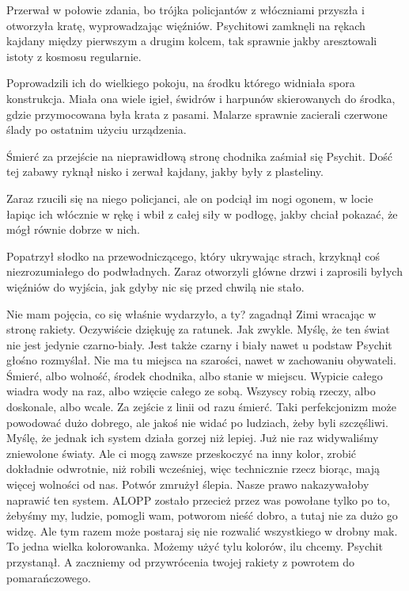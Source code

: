 Przerwał w połowie zdania, bo trójka policjantów z włóczniami przyszła i otworzyła kratę, wyprowadzając więźniów.
Psychitowi zamknęli na rękach kajdany między pierwszym a drugim kolcem, tak sprawnie jakby aresztowali istoty z kosmosu regularnie.

Poprowadzili ich do wielkiego pokoju, na środku którego widniała spora konstrukcja.
Miała ona wiele igieł, świdrów i harpunów skierowanych do środka, gdzie przymocowana była krata z pasami.
Malarze sprawnie zacierali czerwone ślady po ostatnim użyciu urządzenia.

\begin{dialogue}
\ds{} Śmierć za przejście na nieprawidłową stronę chodnika \dm{} zaśmiał się Psychit. \dm{} Dość tej zabawy \dm{} ryknął nisko i zerwał kajdany, jakby były z plasteliny.
\end{dialogue}

Zaraz rzucili się na niego policjanci, ale on podciął im nogi ogonem, w locie łapiąc ich włócznie w rękę i wbił z całej siły w podłogę, 
jakby chciał pokazać, że mógł równie dobrze w nich.

Popatrzył słodko na przewodniczącego, który ukrywając strach, krzyknął coś niezrozumiałego do podwładnych.
Zaraz otworzyli główne drzwi i zaprosili byłych więźniów do wyjścia, jak gdyby nic się przed chwilą nie stało.

\divider{}

\begin{dialogue}
\ds{} Nie mam pojęcia, co się właśnie wydarzyło, a ty? \dm{} zagadnął Zimi wracając w stronę rakiety. \dm{} Oczywiście dziękuję za ratunek. Jak zwykle.
\ds{} Myślę, że ten świat nie jest jedynie czarno-biały. Jest także czarny i biały nawet u podstaw \dm{} Psychit głośno rozmyślał. \dm{} 
Nie ma tu miejsca na szarości, nawet w zachowaniu obywateli. Śmierć, albo wolność, środek chodnika, albo stanie w miejscu. 
Wypicie całego wiadra wody na raz, albo wzięcie całego ze sobą. Wszyscy robią rzeczy, albo doskonale, albo wcale. Za zejście z linii od razu śmierć.
\ds{} Taki perfekcjonizm może powodować dużo dobrego, ale jakoś nie widać po ludziach, żeby byli szczęśliwi. Myślę, że jednak ich system działa gorzej niż lepiej.
\ds{} Już nie raz widywaliśmy zniewolone światy. Ale ci mogą zawsze przeskoczyć na inny kolor, zrobić dokładnie odwrotnie, niż robili wcześniej, więc technicznie rzecz biorąc, mają więcej wolności od nas.
\dm{} Potwór zmrużył ślepia.
\ds{} Nasze prawo nakazywałoby naprawić ten system. ALOPP zostało przecież przez was powołane tylko po to, żebyśmy my, ludzie, pomogli wam, potworom nieść dobro, a tutaj nie za dużo go widzę. 
Ale tym razem może postaraj się nie rozwalić wszystkiego w drobny mak.
\ds{} To jedna wielka kolorowanka. Możemy użyć tylu kolorów, ilu chcemy. \dm{} Psychit przystanął. \dm{} A zaczniemy od przywrócenia twojej rakiety z powrotem do pomarańczowego.
\end{dialogue}

